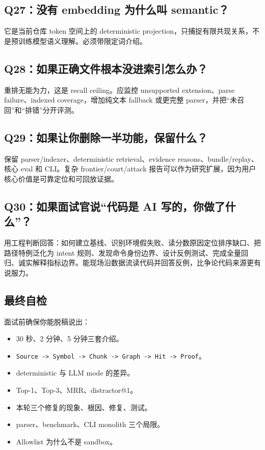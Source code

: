 \documentclass[UTF8,12pt,openany]{ctexbook}
\begin{document}
\subsection{Q27：没有 embedding 为什么叫 semantic？}

它是当前仓库 token 空间上的 deterministic projection，只捕捉有限共现关系，不是预训练模型语义理解。必须带限定词介绍。\par

\subsection{Q28：如果正确文件根本没进索引怎么办？}

重排无能为力，这是 recall ceiling。应监控 unsupported extension、parse failure、indexed coverage，增加纯文本 fallback 或更完整 parser，并把“未召回”和“排错”分开评测。\par

\subsection{Q29：如果让你删除一半功能，保留什么？}

保留 parser/indexer、deterministic retrieval、evidence reasons、bundle/replay、核心 eval 和 CLI。复杂 frontier/court/attack 报告可以作为研究扩展，因为用户核心价值是可靠定位和可回放证据。\par

\subsection{Q30：如果面试官说“代码是 AI 写的，你做了什么”？}

用工程判断回答：如何建立基线、识别环境假失败、读分数原因定位排序缺口、把路径特例泛化为 intent 规则、发现命令身份边界、设计反例测试、完成全量回归、诚实解释指标边界。能现场沿数据流读代码并回答反例，比争论代码来源更有说服力。\par

\subsection{最终自检}

面试前确保你能脱稿说出：\par

\begin{itemize}
\item 30 秒、2 分钟、5 分钟三套介绍。
\item \texttt{Source -> Symbol -> Chunk -> Graph -> Hit -> Proof}。
\item deterministic 与 LLM mode 的差异。
\item Top-1、Top-3、MRR、distractor@1。
\item 本轮三个修复的现象、根因、修复、测试。
\item parser、benchmark、CLI monolith 三个局限。
\item Allowlist 为什么不是 sandbox。
\end{itemize}
\end{document}
